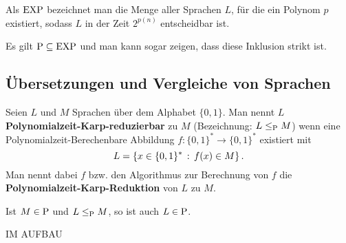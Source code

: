 \begin{defn}
	Als $\operatorname{EXP}$ bezeichnet man die Menge aller Sprachen $L$, für die ein Polynom $p$ existiert, sodass $L$  in der Zeit $2^{p(n)}$ entscheidbar ist. 
\end{defn} 

\begin{bem}
	Es gilt $\operatorname{P}\subseteq \operatorname{EXP}$ und man kann sogar zeigen, dass diese Inklusion strikt ist. 
\end{bem} 

\subsection{Übersetzungen und Vergleiche von Sprachen}

\begin{defn}
	Seien $L$ und $M$ Sprachen über dem Alphabet $\{0,1\}$. Man nennt $L$ \textbf{Polynomialzeit-Karp-reduzierbar} zu $M$ (Bezeichnung: $L \le_{\operatorname{P}} M$) wenn eine Polynomialzeit-Berechenbare Abbildung $f : \{0,1\}^\ast \to \{0,1\}^\ast$ existiert mit 
	\[
		L = \left\{ x \in \{0,1\}^\ast \,:\,  f(x) \in M \right\}.
	\]  
	Man nennt dabei $f$ bzw. den Algorithmus zur Berechnung von $f$ die \textbf{Polynomialzeit-Karp-Reduktion} von $L$ zu $M$. 
\end{defn} 

\begin{prop}
	Ist $M \in \operatorname{P}$ und $L \le_{\operatorname{P}} M$, so ist auch $L \in \operatorname{P}$. 
\end{prop} 

IM AUFBAU 

